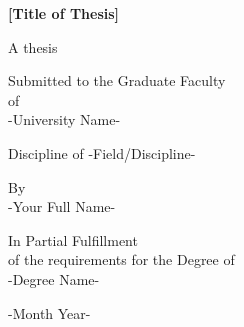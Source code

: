 \begin{titlepage}
    \begin{center}
        \vspace{25.398mm} %
  
        \Huge
        \textbf{[Title of Thesis]} %
            
        \vspace{25.398mm} %
      
        \large      
        A thesis \\ 

        \vspace{12.699mm} %

        Submitted to the Graduate Faculty \\
        of \\
        -University Name- %
        
        \vspace{12.699mm} %
        Discipline of -Field/Discipline- %
        
        \vspace{21.165mm} %
        By \\
        \vspace{21.165mm} %
        -Your Full Name- %
        
        \vspace{25.398mm} %

        \large      
        {In Partial Fulfillment \\
        of the requirements for the Degree of\\
        -Degree Name-} %
            
        \vspace{16.932mm}
        \Large
        -Month Year- %
            
    \end{center}
\end{titlepage}
